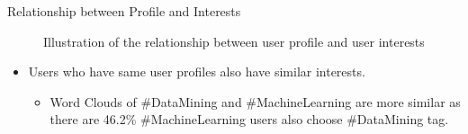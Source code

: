 \documentclass{beamer}
\begin{document}
\begin{frame}
\begin{columns}[T]
\begin{column}{.46\textwidth}
{\begin{block}{Relationship between Profile and Interests }
\begin{figure}[H]
{        } 
        \caption{\small{Illustration of the relationship between user profile and user interests}} 
\end{figure}
\begin{itemize}
\item Users who have same user profiles also have similar interests.
        \begin{itemize}
                \item Word Clouds of \#DataMining and \#MachineLearning are more similar as there are 46.2\% \#MachineLearning users also choose \#DataMining tag.
        \end{itemize}
\end{itemize}
\begin{table}
\centering
\caption{\scriptsize{Word Clouds of tweets generated by users who have the specific user profile}}
\end{table}     
\end{block}

}
\end{column}
\end{columns}
\end{frame}
\end{document}
